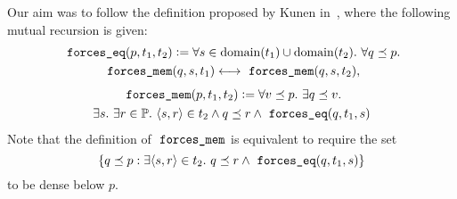 Our aim was to follow the definition proposed by Kunen
in~\cite[p.~257]{kunen2011set}, where the following mutual recursion
is given:
\begin{multline}\label{eq:def-forcing-equality}
  \forceseq (p,t_1,t_2) \defi 
  \forall s\in\dom(t_1)\cup\dom(t_2).\ \forall q\pleq p .\\
  \forcesmem(q,s,t_1)\lsii 
  \forcesmem(q,s,t_2),
\end{multline}
\begin{multline}\label{eq:def-forcing-membership}
  \forcesmem(p,t_1,t_2) \defi  \forall v\pleq p. \ \exists q\pleq v. \\
  \exists s.\ \exists r\in \PP .\ \lb s,r\rb \in
      t_2 \land q \pleq r \land \forceseq(q,t_1,s)
\end{multline}
Note that the definition of $\forcesmem$ is equivalent to require 
 the set 
\[
\{q\pleq p : \exists \lb s,r\rb\in t_2 . \ q\pleq r \land \forceseq(q,t_1,s)\}
\]
to be dense below $p$.

